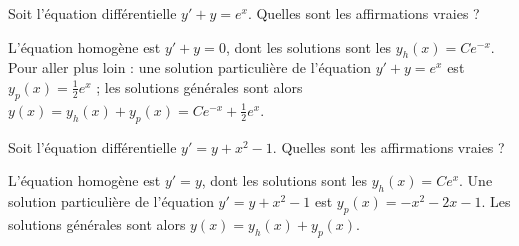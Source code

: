 \begin{question}
Soit l'équation différentielle $y' + y = e^{x}$.
Quelles sont les affirmations vraies ?
\begin{answers}  
\end{answers}
\begin{explanations}
L'équation homogène est $y' + y = 0$, dont les solutions sont les $y_h(x) = Ce^{-x}$.
Pour aller plus loin : une solution particulière de l'équation $y' + y = e^{x}$ est $y_p(x) = \frac12e^{x}$ ; les solutions générales sont alors $y(x) = y_h(x) + y_p(x) = Ce^{-x} + \frac12e^{x}$.
\end{explanations}
\end{question}


\begin{question}
Soit l'équation différentielle $y' = y + x^2-1$.
Quelles sont les affirmations vraies ?
\begin{answers} 
\end{answers}
\begin{explanations}
L'équation homogène est $y' = y$, dont les solutions sont les $y_h(x) = Ce^{x}$.
Une solution particulière de l'équation $y' = y + x^2-1$ est $y_p(x) = -x^2-2x-1$.
Les solutions générales sont alors $y(x) = y_h(x) + y_p(x)$.
\end{explanations}
\end{question}



